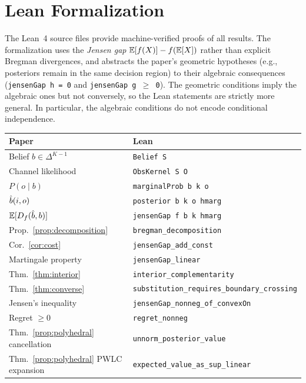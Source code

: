 \section{Lean Formalization}
\label{app:lean}

The Lean~4 source files provide machine-verified proofs of all results.
The formalization uses the \emph{Jensen gap} $\mathbb{E}[f(X)] - f(\mathbb{E}[X])$ rather than explicit Bregman divergences, and abstracts the paper's geometric hypotheses (e.g., posteriors remain in the same decision region) to their algebraic consequences (\texttt{jensenGap h = 0} and \texttt{jensenGap g $\geq$ 0}).
The geometric conditions imply the algebraic ones but not conversely, so the Lean statements are strictly more general.
In particular, the algebraic conditions do not encode conditional independence.

\begin{center}
\footnotesize
\begin{tabular}{@{}ll@{}}
\toprule
Paper & Lean \\
\midrule
Belief $b \in \Delta^{K-1}$ & \texttt{Belief S} \\
Channel likelihood & \texttt{ObsKernel S O} \\
$P(o \mid b)$ & \texttt{marginalProb b k o} \\
$\hat{b}(i,o)$ & \texttt{posterior b k o hmarg} \\
$\mathbb{E}[D_f(\hat{b}, b)]$ & \texttt{jensenGap f b k hmarg} \\
\midrule
Prop.~\ref{prop:decomposition} & \texttt{bregman\_decomposition} \\
Cor.~\ref{cor:cost} & \texttt{jensenGap\_add\_const} \\
Martingale property & \texttt{jensenGap\_linear} \\
Thm.~\ref{thm:interior} & \texttt{interior\_complementarity} \\
Thm.~\ref{thm:converse} & \texttt{substitution\_requires\_boundary\_crossing} \\
Jensen's inequality & \texttt{jensenGap\_nonneg\_of\_convexOn} \\
Regret $\geq 0$ & \texttt{regret\_nonneg} \\
Thm.~\ref{prop:polyhedral} cancellation & \texttt{unnorm\_posterior\_value} \\
Thm.~\ref{prop:polyhedral} PWLC expansion & \texttt{expected\_value\_as\_sup\_linear} \\
\bottomrule
\end{tabular}
\end{center}

